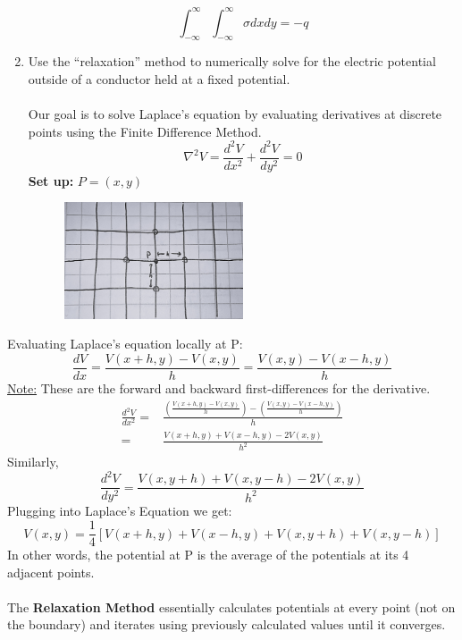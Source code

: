 \documentclass[12pt]{article}
\begin{document}
\begin{enumerate}
\[\int_{-\infty}^{\infty}\int_{-\infty}^{\infty}\sigma dxdy=-q\]
    \item Use the ``relaxation'' method to numerically solve for the electric potential outside of a conductor held at a fixed potential.\\\\
Our goal is to solve Laplace's equation by evaluating derivatives at discrete points using the Finite Difference Method.
\[\nabla^2V=\frac{d^2V}{dx^2}+\frac{d^2V}{dy^2}=0\]
\textbf{Set up:} $P=(x,y)$
\begin{figure}[H]
            \centering
            \includegraphics[width=0.5\textwidth]{relaxxx.JPG}
    \end{figure}
\end{enumerate}
Evaluating Laplace's equation locally at P:
\[\frac{dV}{dx}=\frac{V(x+h,y)-V(x,y)}{h}=\frac{V(x,y)-V(x-h,y)}{h}\]
\underline{Note:} These are the forward and backward first-differences for the derivative.
\begin{align*}
    \frac{d^2V}{dx^2}=&\frac{\left(\frac{V(x+h,y)-V(x,y)}{h}\right)-\left(\frac{V(x,y)-V(x-h,y)}{h}\right)}{h}\\
    =&\frac{V(x+h,y)+V(x-h,y)-2V(x,y)}{h^2}
\end{align*}
Similarly,
\[\frac{d^2V}{dy^2}=\frac{V(x,y+h)+V(x,y-h)-2V(x,y)}{h^2}\]
Plugging into Laplace's Equation we get:
\[\boxed{V(x,y)=\frac{1}{4}\left[V(x+h,y)+V(x-h,y)+V(x,y+h)+V(x,y-h)\right]}\]
In other words, the potential at P is the average of the potentials at its 4 adjacent points.\\\\
The \textbf{Relaxation Method} essentially calculates potentials at every point (not on the boundary) and iterates using previously calculated values until it converges. 
\end{document}
